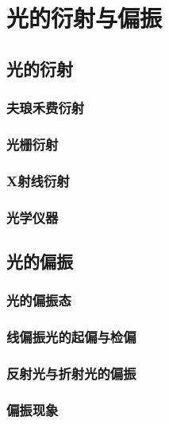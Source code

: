 \chapter{光的衍射与偏振}
\setcounter{example_counter}{1}

\section{光的衍射}

\subsection{夫琅禾费衍射}

\subsection{光栅衍射}

\subsection{X射线衍射}

\subsection{光学仪器}


\section{光的偏振}

\subsection{光的偏振态}

\subsection{线偏振光的起偏与检偏}

\subsection{反射光与折射光的偏振}

\subsection{偏振现象}

